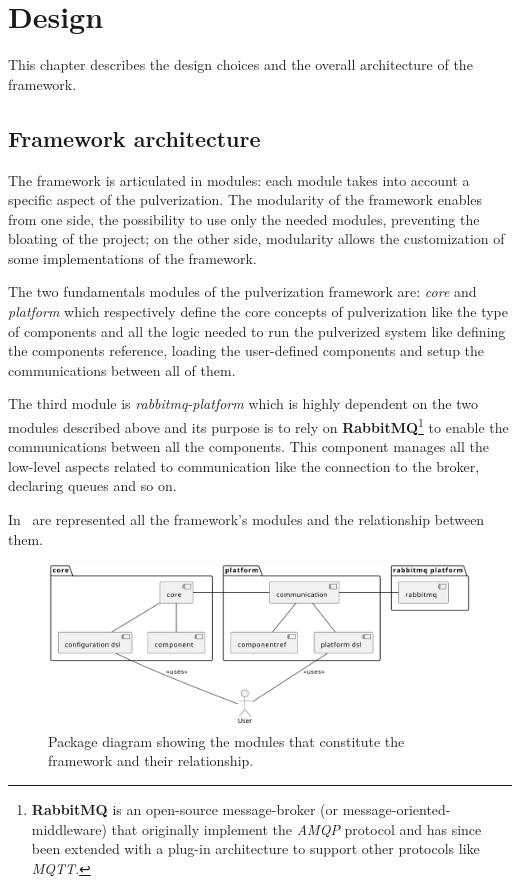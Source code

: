 \chapter{Design} %
\label{chap:design}

This chapter describes the design choices and the overall architecture of the framework. 

\section{Framework architecture}
\label{sec:arch-design}

The framework is articulated in modules: each module takes into account a specific aspect of the pulverization.
The modularity of the framework enables from one side, the possibility to use only the needed modules, preventing the bloating of the project;
on the other side, modularity allows the customization of some implementations of the framework.

The two fundamentals modules of the pulverization framework are: \emph{core} and \emph{platform} which respectively define the core concepts
of pulverization like the type of components and all the logic needed to run the pulverized system like defining the components reference,
loading the user-defined components and setup the communications between all of them.

The third module is \emph{rabbitmq-platform} which is highly dependent on the two modules described above and its purpose is to rely on
\textbf{RabbitMQ}\footnote{\textbf{RabbitMQ} is an open-source message-broker (or message-oriented-middleware) that originally implement
	the \emph{AMQP} protocol and has since been extended with a plug-in architecture to support other protocols like \emph{MQTT}.} to enable
the communications between all the components.
This component manages all the low-level aspects related to communication like the connection to the broker, declaring queues and so on.

In~ are represented all the framework's modules and the relationship between them.

\begin{figure}
	\centering
	\includegraphics[width=\textwidth]{figures/package-diagram.pdf}
	\caption{Package diagram showing the modules that constitute the framework and their relationship.}
	\label{fig:package-diagram}
\end{figure}

